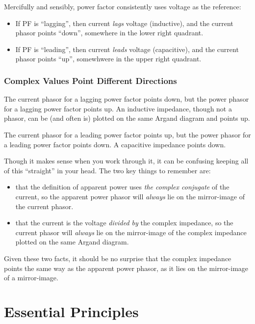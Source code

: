 \documentclass[11pt]{article}
\begin{document}
Mercifully and sensibly, power factor consistently uses voltage as the reference:

\begin{itemize}
  \item If PF is ``lagging'', then current \emph{lags} voltage
    (inductive), and the current phasor points ``down'', somewhere in
    the lower right quadrant.
  \item If PF is ``leading'', then current \emph{leads} voltage (capacitive), and the current phasor points ``up'', somewhwere in the upper right quadrant.
\end{itemize}


\subsubsection{Complex Values Point Different Directions}

The current phasor for a lagging power factor points down, but the
power phasor for a lagging power factor points up. An inductive
impedance, though not a phasor, can be (and often is) plotted on the
same Argand diagram and points up.

The current phasor for a leading power factor points up, but the power
phasor for a leading power factor points down. A capacitive impedance
points down.

Though it makes sense when you work through it, it can be confusing
keeping all of this ``straight'' in your head. The two key things to
remember are: 
\begin{itemize}
  \item that the definition of apparent power uses \emph{the complex
  conjugate} of the current, so the apparent power phasor will
    \emph{always} lie on the mirror-image of the current phasor.
  \item that the current is the voltage \emph{divided by} the complex
    impedance, so the current phasor will \emph{always} lie on the
    mirror-image of the complex impedance plotted on the same Argand
    diagram.
\end{itemize}

Given these two facts, it should be no surprise that the complex
impedance points the same way as the apparent power phasor, as it lies
on the mirror-image of a mirror-image.

\section{Essential Principles}
\end{document}
